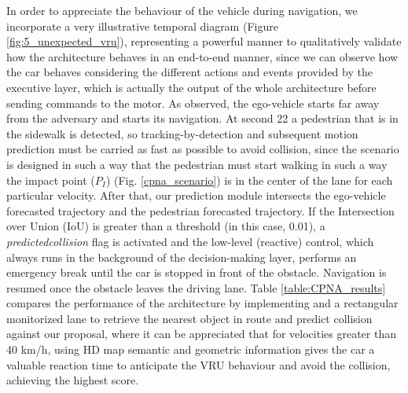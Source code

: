In order to appreciate the behaviour of the vehicle during navigation, we incorporate a very illustrative temporal diagram (Figure \ref{fig:5_unexpected_vru}), representing a powerful manner to qualitatively validate how the architecture behaves in an end-to-end manner, since we can observe how the car behaves considering the different actions and events \cite{gomez2021train} provided by the executive layer, which is actually the output of the whole architecture before sending commands to the motor. As observed, the ego-vehicle starts far away from the adversary and starts its navigation. At second 22 a pedestrian that is in the sidewalk is detected, so tracking-by-detection and subsequent motion prediction must be carried as fast as possible to avoid collision, since the scenario is designed in such a way that the pedestrian must start walking in such a way the impact point (\(P_I\)) (Fig. \ref{cpna_scenario}) is in the center of the lane for each particular velocity. After that, our prediction module intersects the ego-vehicle forecasted trajectory and the pedestrian forecasted trajectory. If the Intersection over Union (IoU) is greater than a threshold (in this case, 0.01), a \textit{predictedcollision} flag is activated and the low-level (reactive) control, which always runs in the background of the decision-making layer, performs an emergency break until the car is stopped in front of the obstacle. Navigation is resumed once the obstacle leaves the driving lane. Table \ref{table:CPNA_results} compares the performance of the architecture by implementing \cite{gomez2020real} and a rectangular monitorized lane to retrieve the nearest object in route and predict collision against our proposal, where it can be appreciated that for velocities greater than 40 km/h, using HD map semantic and geometric information gives the car a valuable reaction time to anticipate the VRU behaviour and avoid the collision, achieving the highest score. 

